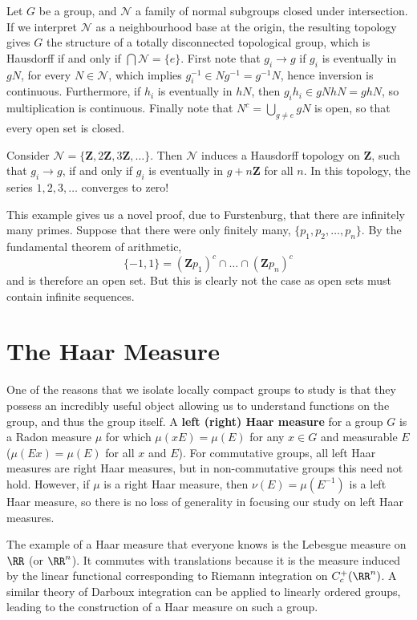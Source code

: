 Let $G$ be a group, and $\mathcal{N}$ a family of normal subgroups closed under intersection. If we interpret $\mathcal{N}$ as a neighbourhood base at the origin, the resulting topology gives $G$ the structure of a totally disconnected topological group, which is Hausdorff if and only if $\bigcap \mathcal{N} = \{ e \}$. First note that $g_i \to g$ if $g_i$ is eventually in $gN$, for every $N \in \mathcal{N}$, which implies $g_i^{-1} \in Ng^{-1} = g^{-1}N$, hence inversion is continuous. Furthermore, if $h_i$ is eventually in $hN$, then $g_ih_i \in gNhN = ghN$, so multiplication is continuous. Finally note that $N^c = \bigcup_{g \neq e} gN$ is open, so that every open set is closed.

\begin{example}
    Consider $\mathcal{N} = \{ \mathbf{Z}, 2\mathbf{Z}, 3\mathbf{Z}, \dots \}$. Then $\mathcal{N}$ induces a Hausdorff topology on $\mathbf{Z}$, such that $g_i \to g$, if and only if $g_i$ is eventually in $g + n \mathbf{Z}$ for all $n$. In this topology, the series $1,2,3,\dots$ converges to zero!
\end{example}

This example gives us a novel proof, due to Furstenburg, that there are infinitely many primes. Suppose that there were only finitely many, $\{ p_1, p_2, \dots, p_n \}$. By the fundamental theorem of arithmetic,
%
\[ \{ -1, 1 \} = (\mathbf{Z} p_1)^c \cap \dots \cap (\mathbf{Z} p_n)^c \]
%
and is therefore an open set. But this is clearly not the case as open sets must contain infinite sequences.

\chapter{The Haar Measure}

One of the reasons that we isolate locally compact groups to study is that they possess an incredibly useful object allowing us to understand functions on the group, and thus the group itself. A {\bf left (right) Haar measure} for a group $G$ is a Radon measure $\mu$ for which $\mu(xE) = \mu(E)$ for any $x \in G$ and measurable $E$ ($\mu(Ex) = \mu(E)$ for all $x$ and $E$). For commutative groups, all left Haar measures are right Haar measures, but in non-commutative groups this need not hold. However, if $\mu$ is a right Haar measure, then $\nu(E) = \mu(E^{-1})$ is a left Haar measure, so there is no loss of generality in focusing our study on left Haar measures.

\begin{example}
    The example of a Haar measure that everyone knows is the Lebesgue measure on $\RR$ (or $\RR^n$). It commutes with translations because it is the measure induced by the linear functional corresponding to Riemann integration on $C_c^+(\RR^n)$. A similar theory of Darboux integration can be applied to linearly ordered groups, leading to the construction of a Haar measure on such a group.
\end{example}

